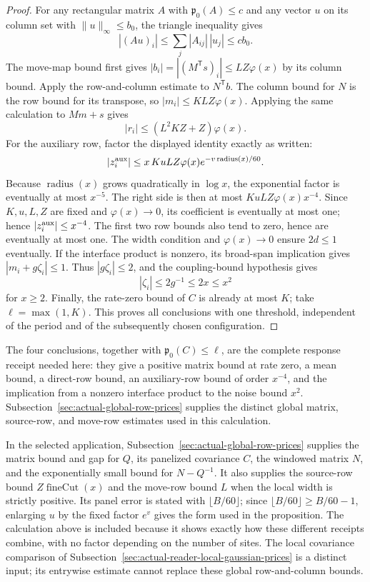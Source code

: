 \begin{proof}
For any rectangular matrix $A$ with $\mathfrak p_0(A)\leq c$ and any vector
$u$ on its column set with $\|u\|_\infty\leq b_0$, the triangle inequality gives
\[
 |(Au)_i|\leq\sum_j|A_{ij}|\,|u_j|
             \leq c b_0.
\]
The move-map bound first gives
$|b_i|=|(M^{\mathsf T}s)_i|\leq LZ\varphi(x)$ by its column bound.
Apply the row-and-column estimate to $N^{\mathsf T}b$. The column bound
for $N$ is the row bound for its transpose, so
$|m_i|\leq KLZ\varphi(x)$. Applying the same calculation to $Mm+s$ gives
\[
 |r_i|\leq (L^2KZ+Z)\varphi(x).
\]
For the auxiliary row, factor the displayed identity exactly as written:
\[
 |z_i^{\rm aux}|\leq x\,K u LZ\varphi(x)
       e^{-v\operatorname{radius}(x)/60}.
\]
Because $\operatorname{radius}(x)$ grows quadratically in $\log x$,
the exponential factor is eventually at most $x^{-5}$. The right side is
then at most $K u LZ\varphi(x)x^{-4}$. Since $K,u,L,Z$ are fixed and
$\varphi(x)\to0$, its coefficient is eventually at most one; hence
$|z_i^{\rm aux}|\leq x^{-4}$. The first two row bounds also tend to zero,
hence are eventually at most one.
The width condition and $\varphi(x)\to0$ ensure $2d\leq1$ eventually.
If the interface product is nonzero, its broad-span implication gives
$|m_i+g\zeta_i|\leq1$. Thus $|g\zeta_i|\leq2$, and the coupling-bound
hypothesis gives
\[
 |\zeta_i|\leq2g^{-1}\leq2x\leq x^2
\]
for $x\geq2$. Finally, the rate-zero bound of $C$ is already at most $K$;
take $\ell=\max(1,K)$. This proves all conclusions with one threshold,
independent of the period and of the subsequently chosen configuration.
\end{proof}

The four conclusions, together with $\mathfrak p_0(C)\leq\ell$, are the
complete response receipt needed here: they give a positive matrix bound
at rate zero, a mean bound, a direct-row bound, an auxiliary-row bound of
order $x^{-4}$, and the implication from a nonzero interface product to the
noise bound $x^2$. Subsection~\ref{sec:actual-global-row-prices} supplies
the distinct global matrix, source-row, and move-row estimates used in
this calculation.

In the selected application, Subsection~\ref{sec:actual-global-row-prices}
supplies the matrix bound and gap for $Q$, its panelized covariance $C$,
the windowed matrix $N$, and the exponentially small bound for $N-Q^{-1}$.
It also supplies the source-row bound $Z\operatorname{fineCut}(x)$ and the
move-row bound $L$ when the local width is strictly positive. Its panel
error is stated with $\lfloor B/60\rfloor$; since
$\lfloor B/60\rfloor\ge B/60-1$, enlarging $u$ by the fixed factor
$e^v$ gives the form used in the proposition. The calculation above is included because it shows
exactly how these different receipts combine, with no factor depending on
the number of sites. The local covariance comparison of
Subsection~\ref{sec:actual-reader-local-gaussian-prices} is a distinct input;
its entrywise estimate cannot replace these global row-and-column bounds.

